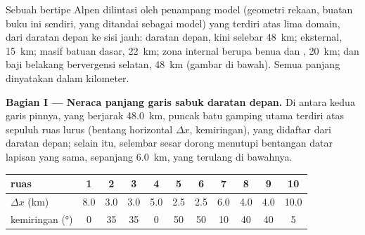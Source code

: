 \begin{problem}\label{pb:b2:alpine-orogen:1}
Sebuah  bertipe Alpen dilintasi oleh penampang model (geometri rekaan, buatan buku ini sendiri,
yang ditandai sebagai model) yang terdiri atas lima domain, dari daratan depan ke sisi jauh:
 daratan depan, kini selebar \qty{48}{km};  eksternal, \qty{15}{km};
masif batuan dasar, \qty{22}{km}; zona internal berupa  benua dan ,
\qty{20}{km}; dan baji belakang bervergensi selatan, \qty{48}{km}
(gambar di bawah). Semua panjang dinyatakan dalam kilometer.

\begin{omfigure}
\centering
{}
\par{}
\end{omfigure}

\noindent\textbf{Bagian I --- Neraca panjang garis sabuk daratan depan.} Di antara kedua garis
pinnya, yang berjarak \qty{48.0}{km}, puncak batu gamping utama terdiri atas sepuluh ruas lurus
(bentang horizontal $\Delta x$, kemiringan), yang didaftar dari daratan depan; selain itu, selembar sesar dorong
menutupi bentangan datar lapisan yang sama, sepanjang \qty{6.0}{km}, yang terulang di bawahnya.

\smallskip
\begin{center}\small
\begin{tabular}{l|cccccccccc}
ruas & 1 & 2 & 3 & 4 & 5 & 6 & 7 & 8 & 9 & 10\\ \hline
$\Delta x$ (\unit{km}) & 8.0 & 3.0 & 3.0 & 5.0 & 2.5 & 2.5 & 6.0 & 4.0 & 4.0 & 10.0\\
kemiringan (\unit{\degree}) & 0 & 35 & 35 & 0 & 50 & 50 & 10 & 40 & 40 & 5
\end{tabular}
\end{center}
\smallskip


\end{problem}

